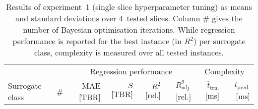 \begin{table}[h]
	\centering
	{\footnotesize
		\begin{tabular}{lrrrrrrr}
		\toprule
		{} & {} & \multicolumn{4}{c}{Regression performance} &
		\multicolumn{2}{c}{Complexity}\\
		\cmidrule(lr){3-6}
		\cmidrule(lr){7-8}
		Surrogate class & \# & MAE [TBR] & $S$ [TBR] & $R^2$ [rel.] & $R^2_{\text{adj.}}$ [rel.]
						& $\overline{t}_{\text{trn.}}$ [ms] &
						$\overline{t}_{\text{pred.}}$ [ms]\\
		\midrule
		
		\bottomrule
		\end{tabular}
	}
	\caption{Results of experiment~1 (single slice hyperparameter tuning) as
		means and standard deviations over 4~tested slices. Column \# gives the number of Bayesian
		optimisation iterations. While regression performance is reported for the
		best instance (in $R^2$) per surrogate class, complexity is measured over all tested instances.}
	\label{tbl:exp1-detailed-results}
\end{table}

